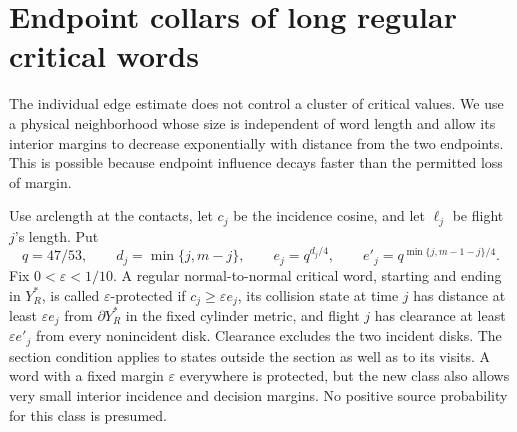 \section{Endpoint collars of long regular critical words}
\label{sec:v45-critical-collars}
The individual edge estimate does not control a cluster of critical
values. We use a physical neighborhood whose size is independent of
word length and allow its interior margins to decrease exponentially
with distance from the two endpoints. This is possible because endpoint
influence decays faster than the permitted loss of margin.

Use arclength at the contacts, let $c_j$ be the incidence cosine, and
let $\ell_j$ be flight $j$'s length. Put
\[
 q=47/53,\qquad d_j=\min\{j,m-j\},\qquad
 e_j=q^{d_j/4},\qquad e'_j=q^{\min\{j,m-1-j\}/4}.
\]
Fix $0<\varepsilon<1/10$. A regular normal-to-normal critical word,
starting and ending in $Y_R^*$, is called $\varepsilon$-protected if
$c_j\ge\varepsilon e_j$, its collision state at time $j$ has distance
at least $\varepsilon e_j$ from $\partial Y_R^*$ in the fixed cylinder
metric, and flight $j$ has clearance at least $\varepsilon e'_j$ from
every nonincident disk. Clearance excludes the two incident disks.
The section condition applies to states outside the section as well
as to its visits. A word with a fixed margin $\varepsilon$ everywhere
is protected, but the new class also allows very small interior
incidence and decision margins. No positive source probability for
this class is presumed.


